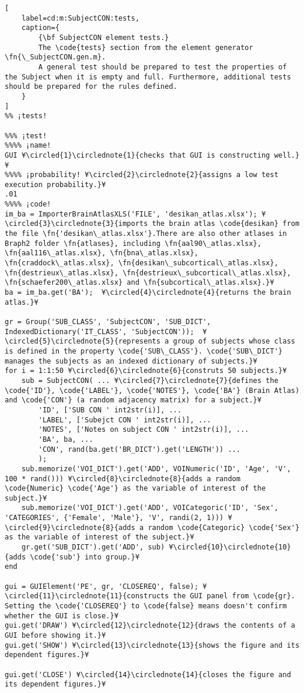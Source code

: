 \documentclass{tufte-handout}
\begin{document}
\clearpage

\begin{lstlisting}[
	label=cd:m:SubjectCON:tests,
	caption={
		{\bf SubjectCON element tests.}
		The \code{tests} section from the element generator \fn{\_SubjectCON.gen.m}.
		A general test should be prepared to test the properties of the Subject when it is empty and full. Furthermore, additional tests should be prepared for the rules defined.
	}
]			
%% ¡tests!

%%% ¡test!
%%%% ¡name!
GUI ¥\circled{1}\circlednote{1}{checks that GUI is constructing well.}¥
%%%% ¡probability! ¥\circled{2}\circlednote{2}{assigns a low test execution probability.}¥
.01
%%%% ¡code!
im_ba = ImporterBrainAtlasXLS('FILE', 'desikan_atlas.xlsx'); ¥\circled{3}\circlednote{3}{imports the brain atlas \code{desikan} from the file \fn{'desikan\_atlas.xlsx'}.There are also other atlases in Braph2 folder \fn{atlases}, including \fn{aal90\_atlas.xlsx}, \fn{aal116\_atlas.xlsx}, \fn{bna\_atlas.xlsx}, \fn{craddock\_atlas.xlsx}, \fn{desikan\_subcortical\_atlas.xlsx}, \fn{destrieux\_atlas.xlsx}, \fn{destrieux\_subcortical\_atlas.xlsx},  \fn{schaefer200\_atlas.xlsx} and \fn{subcortical\_atlas.xlsx}.}¥
ba = im_ba.get('BA');  ¥\circled{4}\circlednote{4}{returns the brain atlas.}¥

gr = Group('SUB_CLASS', 'SubjectCON', 'SUB_DICT', IndexedDictionary('IT_CLASS', 'SubjectCON'));  ¥\circled{5}\circlednote{5}{represents a group of subjects whose class is defined in the property \code{'SUB\_CLASS'}. \code{'SUB\_DICT'} manages the subjects as an indexed dictionary of subjects.}¥
for i = 1:1:50 ¥\circled{6}\circlednote{6}{construts 50 subjects.}¥
    sub = SubjectCON( ... ¥\circled{7}\circlednote{7}{defines the \code{'ID'}, \code{'LABEL'}, \code{'NOTES'}, \code{'BA'} (Brain Atlas) and \code{'CON'} (a random adjacency matrix) for a subject.}¥
        'ID', ['SUB CON ' int2str(i)], ...
        'LABEL', ['Subejct CON ' int2str(i)], ...
        'NOTES', ['Notes on subject CON ' int2str(i)], ...
        'BA', ba, ...
        'CON', rand(ba.get('BR_DICT').get('LENGTH')) ...
        );
    sub.memorize('VOI_DICT').get('ADD', VOINumeric('ID', 'Age', 'V', 100 * rand())) ¥\circled{8}\circlednote{8}{adds a random \code{Numeric} \code{'Age'} as the variable of interest of the subject.}¥
    sub.memorize('VOI_DICT').get('ADD', VOICategoric('ID', 'Sex', 'CATEGORIES', {'Female', 'Male'}, 'V', randi(2, 1))) ¥\circled{9}\circlednote{8}{adds a random \code{Categoric} \code{'Sex'} as the variable of interest of the subject.}¥
    gr.get('SUB_DICT').get('ADD', sub) ¥\circled{10}\circlednote{10}{adds \code{'sub'} into group.}¥
end

gui = GUIElement('PE', gr, 'CLOSEREQ', false); ¥\circled{11}\circlednote{11}{constructs the GUI panel from \code{gr}. Setting the \code{'CLOSEREQ'} to \code{false} means doesn't confirm whether the GUI is close.}¥
gui.get('DRAW') ¥\circled{12}\circlednote{12}{draws the contents of a GUI before showing it.}¥
gui.get('SHOW') ¥\circled{13}\circlednote{13}{shows the figure and its dependent figures.}¥

gui.get('CLOSE') ¥\circled{14}\circlednote{14}{closes the figure and its dependent figures.}¥
\end{lstlisting}
\end{document}
